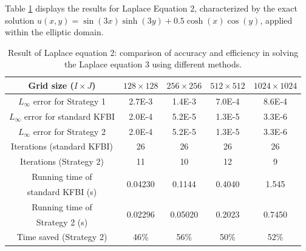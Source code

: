 \documentclass{article}
\begin{document}
Table \ref{label1_1_3} displays the results for Laplace Equation 2, characterized by the exact solution $u(x, y) = \sin(3x)\sinh(3y) + 0.5 \cosh(x) \cos(y)$, applied within the elliptic domain.
\begin{table}[ht]
    \centering
    \begin{tabular}{|c|c|c|c|c|} \hline 
         Grid size ($I\times J$) & $128 \times 128$ & $256 \times 256$ & $512 \times 512$ & $1024 \times 1024$ \\ \hline 
         $L_{\infty}$ error for Strategy 1 & 2.7E-3 & 1.4E-3 & 7.0E-4 & 8.6E-4\\ \hline
         $L_{\infty}$ error for standard KFBI & 2.0E-4 & 5.2E-5 & 1.3E-5 & 3.3E-6\\ \hline
         $L_{\infty}$ error for Strategy 2 & 2.0E-4 & 5.2E-5 & 1.3E-5 & 3.3E-6\\ \hline
         Iterations (standard KFBI) &  26&  26&  26& 26\\ \hline 
         Iterations (Strategy 2) &  11&  10&  12& 9\\ \hline 
         
         Running time of 
         & \multirow{2}{*}{0.04230\bigstrut}
         & \multirow{2}{*}{0.1144\bigstrut}
         & \multirow{2}{*}{0.4040\bigstrut}
         & \multirow{2}{*}{1.545\bigstrut} \\
         standard KFBI (s) & & & & \\ \hline
         
         Running time of 
         & \multirow{2}{*}{0.02296\bigstrut}
         & \multirow{2}{*}{0.05020\bigstrut}
         & \multirow{2}{*}{0.2023\bigstrut}
         & \multirow{2}{*}{0.7450\bigstrut} \\
         Strategy 2 (s) & & & & \\ \hline
        
         Time saved (Strategy 2) & 46\%& 56\%& 50\%& 52\%\\ \hline
    \end{tabular}
    \caption{Result of Laplace equation 2: comparison of accuracy and efficiency in solving the Laplace equation 3 using different methods.}
    \label{label1_1_3}
\end{table}
\end{document}
